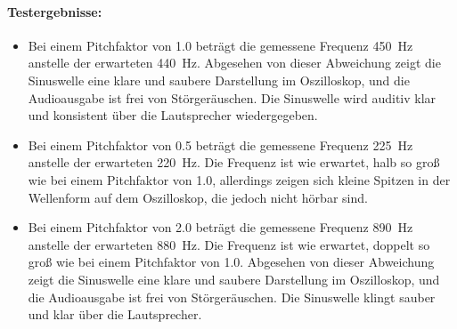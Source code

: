 \paragraph{Testergebnisse:}
\begin{itemize}
	\item Bei einem Pitchfaktor von 1.0 beträgt die gemessene Frequenz \SI{450}{\hertz} anstelle der erwarteten \SI{440}{\hertz}. 
	Abgesehen von dieser Abweichung zeigt die Sinuswelle eine klare und saubere Darstellung im Oszilloskop, und die Audioausgabe ist frei von Störgeräuschen. 
	Die Sinuswelle wird auditiv klar und konsistent über die Lautsprecher wiedergegeben.
	
	\item Bei einem Pitchfaktor von 0.5 beträgt die gemessene Frequenz \SI{225}{\hertz} anstelle der erwarteten \SI{220}{\hertz}. 
	Die Frequenz ist wie erwartet, halb so groß wie bei einem Pitchfaktor von 1.0, allerdings zeigen sich kleine Spitzen in der Wellenform auf dem Oszilloskop, die jedoch nicht hörbar sind. 
	
	
	
	\item Bei einem Pitchfaktor von 2.0 beträgt die gemessene Frequenz \SI{890}{\hertz} anstelle der erwarteten \SI{880}{\hertz}. 
	Die Frequenz ist wie erwartet, doppelt so groß wie bei einem Pitchfaktor von 1.0.
	Abgesehen von dieser Abweichung zeigt die Sinuswelle eine klare und saubere Darstellung im Oszilloskop, und die Audioausgabe ist frei von Störgeräuschen. 
	Die Sinuswelle klingt sauber und klar über die Lautsprecher.
\end{itemize}

